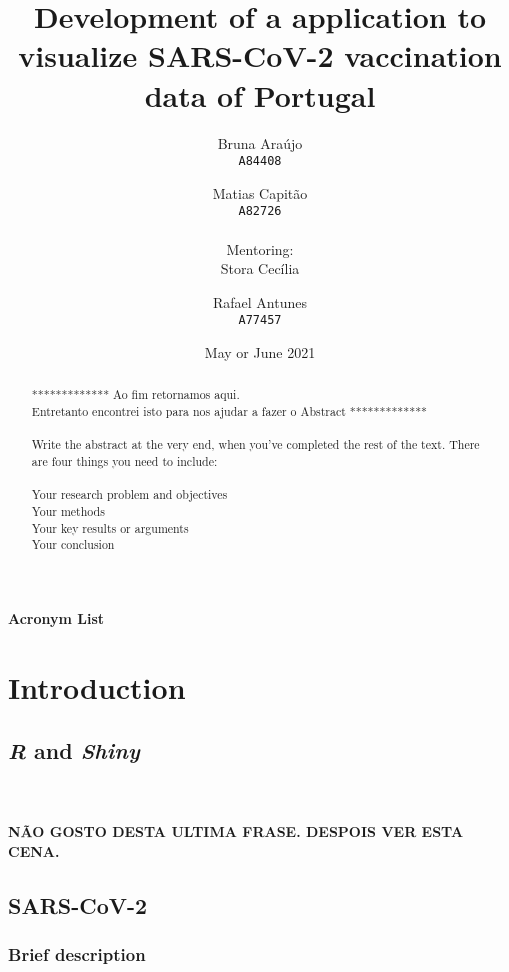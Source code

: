 \documentclass[11pt,a4paper]{report}
\title{Development of a \Shiny application to visualize SARS-CoV-2 vaccination data of Portugal}
\author{
  Bruna Araújo\\
  \texttt{A84408}
  \and
  Matias Capitão\\
  \texttt{A82726} \\ 
  \\ Mentoring:\\
  Stora Cecília \\
  \and
  Rafael Antunes\\
  \texttt{A77457}
}
\date{May or June 2021}
\def\R{{\textsl{R }}}
\def\Shiny{\textsl{Shiny }}
\begin{document}
\maketitle

\begin{abstract}
    ************* Ao fim retornamos aqui.\\ Entretanto encontrei isto para nos ajudar a fazer o Abstract *************\\ \\
    Write the abstract at the very end, when you’ve completed the rest of the text. There are four things you need to include:\\ \\

    Your research problem and objectives\\
    Your methods\\
    Your key results or arguments\\
    Your conclusion

\end{abstract}

\tableofcontents
\newpage

\listoffigures
\newpage

\listoftables
\newpage

{\huge\textbf{Acronym List}}\\



\chapter{Introduction}
\section{\R and \Shiny}



\\
\\
\textbf{NÃO GOSTO DESTA ULTIMA FRASE. DESPOIS VER ESTA CENA.}


\section{SARS-CoV-2}
\subsection{Brief description}
\end{document}
